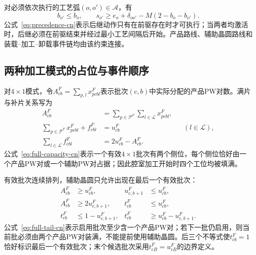 \documentclass[final,5p,times,twocolumn]{elsarticle}
\begin{document}
对必须依次执行的工艺弧$(o,o')\in\mathcal A$，有
\begin{equation}
b_{o'}\le b_o,\qquad
s_{o'}\ge e_o+\delta_{oo'}-M(2-b_o-b_{o'}).
\label{eq:precedence-cn}
\end{equation}
公式~\eqref{eq:precedence-cn}表示后继动作只有在前驱存在时才可执行；当两者均激活时，后继必须在前驱结束并经过最小工艺间隔后开始。产品路线、辅助晶圆路线和装载--加工--卸载事件链均由该约束连接。

\subsection{两种加工模式的占位与事件顺序}

对$4\times1$模式，令$A^F_{cb}=\sum_{p,l}x^F_{pcbl}$表示批次$(c,b)$中实际分配的产品PW对数。满片与补片关系写为
\begin{equation}
\begin{aligned}
A^F_{cb}&=\sum_{p\in\mathcal P^F}\sum_{l\in\mathcal L}x^F_{pcbl},\\
\sum_{p\in\mathcal P^F}x^F_{pcbl}+f^F_{cbl}&=u^F_{cb}
&& (l\in\mathcal L),\\
\sum_{l\in\mathcal L}f^F_{cbl}&=2u^F_{cb}-A^F_{cb}.
\end{aligned}
\label{eq:full-capacity-cn}
\end{equation}
公式~\eqref{eq:full-capacity-cn}表示一个有效$4\times1$批次有两个侧位，每个侧位恰好由一个产品PW对或一个辅助PW对占据；因此腔室加工开始时四个工位均被填满。

有效批次连续排列，辅助晶圆只允许出现在最后一个有效批次：
\begin{equation}
\begin{aligned}
A^F_{cb}&\ge u^F_{cb}, &u^F_{c,b+1}&\le u^F_{cb},\\
A^F_{cb}&\ge2u^F_{c,b+1},
&t^F_{cb}&\le u^F_{cb},\\
t^F_{cb}&\le1-u^F_{c,b+1},
&t^F_{cb}&\ge u^F_{cb}-u^F_{c,b+1}.
\end{aligned}
\label{eq:full-tail-cn}
\end{equation}
公式~\eqref{eq:full-tail-cn}表示启用批次至少含一个产品PW对；若下一批仍启用，则当前批必须由两个产品PW对装满，不能提前使用辅助晶圆。后三个不等式使$t^F_{cb}=1$恰好标识最后一个有效批次；末个候选批次采用$t^F_{cB}=u^F_{cB}$的边界定义。
\end{document}
